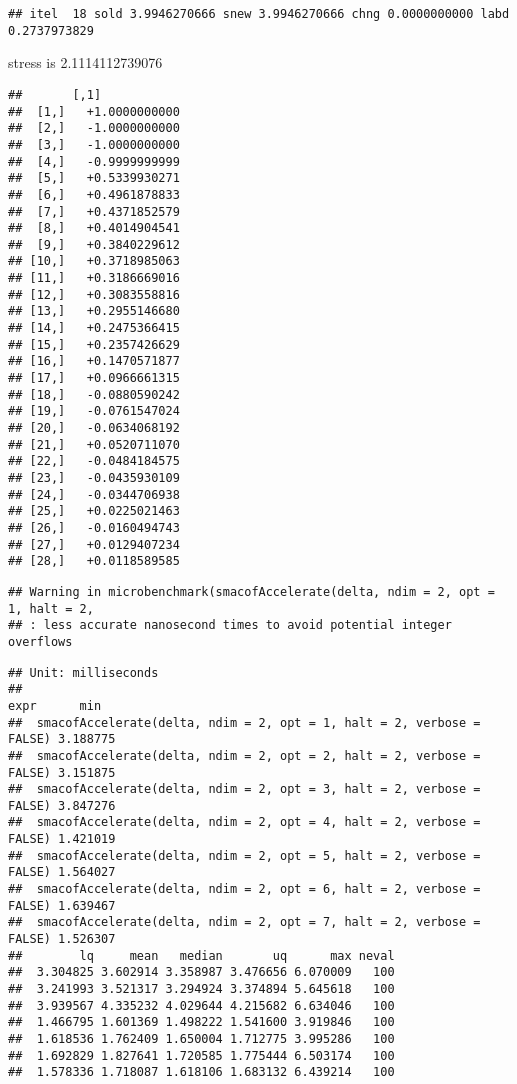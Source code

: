 \documentclass[
  12pt,
]{article}
\begin{document}
\begin{verbatim}
## itel  18 sold 3.9946270666 snew 3.9946270666 chng 0.0000000000 labd 0.2737973829
\end{verbatim}

stress is 2.1114112739076

\begin{verbatim}
##       [,1]           
##  [1,]   +1.0000000000
##  [2,]   -1.0000000000
##  [3,]   -1.0000000000
##  [4,]   -0.9999999999
##  [5,]   +0.5339930271
##  [6,]   +0.4961878833
##  [7,]   +0.4371852579
##  [8,]   +0.4014904541
##  [9,]   +0.3840229612
## [10,]   +0.3718985063
## [11,]   +0.3186669016
## [12,]   +0.3083558816
## [13,]   +0.2955146680
## [14,]   +0.2475366415
## [15,]   +0.2357426629
## [16,]   +0.1470571877
## [17,]   +0.0966661315
## [18,]   -0.0880590242
## [19,]   -0.0761547024
## [20,]   -0.0634068192
## [21,]   +0.0520711070
## [22,]   -0.0484184575
## [23,]   -0.0435930109
## [24,]   -0.0344706938
## [25,]   +0.0225021463
## [26,]   -0.0160494743
## [27,]   +0.0129407234
## [28,]   +0.0118589585
\end{verbatim}

\begin{verbatim}
## Warning in microbenchmark(smacofAccelerate(delta, ndim = 2, opt = 1, halt = 2,
## : less accurate nanosecond times to avoid potential integer overflows
\end{verbatim}

\begin{verbatim}
## Unit: milliseconds
##                                                                   expr      min
##  smacofAccelerate(delta, ndim = 2, opt = 1, halt = 2, verbose = FALSE) 3.188775
##  smacofAccelerate(delta, ndim = 2, opt = 2, halt = 2, verbose = FALSE) 3.151875
##  smacofAccelerate(delta, ndim = 2, opt = 3, halt = 2, verbose = FALSE) 3.847276
##  smacofAccelerate(delta, ndim = 2, opt = 4, halt = 2, verbose = FALSE) 1.421019
##  smacofAccelerate(delta, ndim = 2, opt = 5, halt = 2, verbose = FALSE) 1.564027
##  smacofAccelerate(delta, ndim = 2, opt = 6, halt = 2, verbose = FALSE) 1.639467
##  smacofAccelerate(delta, ndim = 2, opt = 7, halt = 2, verbose = FALSE) 1.526307
##        lq     mean   median       uq      max neval
##  3.304825 3.602914 3.358987 3.476656 6.070009   100
##  3.241993 3.521317 3.294924 3.374894 5.645618   100
##  3.939567 4.335232 4.029644 4.215682 6.634046   100
##  1.466795 1.601369 1.498222 1.541600 3.919846   100
##  1.618536 1.762409 1.650004 1.712775 3.995286   100
##  1.692829 1.827641 1.720585 1.775444 6.503174   100
##  1.578336 1.718087 1.618106 1.683132 6.439214   100
\end{verbatim}
\end{document}
